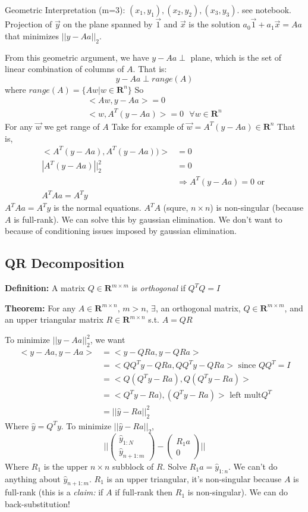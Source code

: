 Geometric Interpretation (m=3): $(x_1, y_1), (x_2, y_2), (x_3,
y_3)$. see notebook. Projection of $\vec y$ on the plane spanned by
$\vec 1$ and $\vec x$ is the solution $a_0\vec 1 + a_1\vec x = Aa$ that
minimizes $||y-Aa||_2$. 

From this geometric argument, we have $y-Aa \perp $ plane, which is
the set of linear combination of columns of $A$. That is:
$$y-Aa \perp range(A)$$ where $range(A)=\{Aw| w\in \mathbf{R}^n\}$
So
\begin{align*}
<Aw, y-Aa> = 0\\
<w, A^T(y-Aa)> = 0 \text{ } \forall w\in \mathbf{R}^n
\end{align*}
For any $\vec w$ we get range of $A$
Take for example of $\vec w=A^T(y-Aa) \in \mathbf{R}^n$ That is, 
\begin{align*}
<A^T(y-Aa), A^T(y-Aa))> &=0\\
|A^T(y-Aa)||^2_2 &= 0\\
&\Rightarrow A^T(y-Aa) = 0 \text{ or }\\
A^TAa = A^Ty
\end{align*}
$A^TAa = A^Ty$ is the normal equations. $A^TA$ (squre, $n\times n$) is
non-singular (because $A$ is full-rank). We can solve this by gaussian elimination.
We don't want to because of conditioning issues imposed by gaussian elimination.

\subsection{QR Decomposition}
\textbf{Definition:} A matrix $Q\in \mathbf{R}^{m\times m}$ is
\emph{orthogonal} if $Q^TQ=I$

\textbf{Theorem:} For any $A\in \mathbf{R}^{m\times n}$, $m>n$, $\exists$,
an orthogonal matrix, $Q\in \mathbf{R}^{m\times m}$, and an upper
triangular matrix $R\in \mathbf{R}^{m\times n}$ s.t. $A=QR$

To minimize $||y-Aa||^2_2$, we want
\begin{align*}
  <y-Aa, y-Aa> &= <y-QRa, y-QRa>\\
&=<QQ^Ty-QRa, QQ^Ty-QRa> \text{ since } QQ^T=I\\
&=<Q(Q^Ty-Ra), Q(Q^Ty-Ra)>\\
&=<Q^Ty-Ra), (Q^Ty-Ra)> \text{ left mult} Q^T\\
&=||\hat y - Ra||^2_2
\end{align*}
Where $\hat y = Q^Ty$. To minimize $||\hat y - Ra||_2$, 
$$||
\begin{pmatrix}
\hat y_{1:N}\\ \hat y_{n+1:m}  
\end{pmatrix} - 
\begin{pmatrix}
R_1a \\ 0
\end{pmatrix}||
$$
Where $R_1$ is the upper $n\times n$ subblock of $R$.
Solve $R_1a = \hat y_{1:n}$. We can't do anything about $\hat
y_{n+1:m}$.
$R_1$ is an upper triangular, it's non-singular because $A$ is
full-rank (this is a \emph{claim:} if $A$ if full-rank then $R_1$ is non-singular). We can
do back-substitution!

